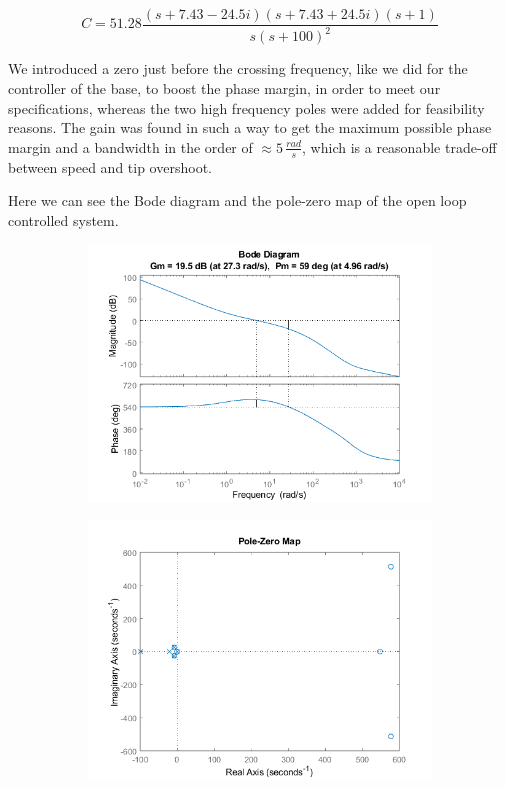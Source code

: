 \begin{equation*}
    C = 51.28 \frac{(s+7.43-24.5i)(s+7.43+24.5i)(s+1)}{s(s+100)^2}
\end{equation*}

We introduced a zero just before the crossing frequency, like we did for the controller of the base, to boost the phase margin, in order to meet our specifications, whereas the two high frequency poles were added for feasibility reasons. The gain was found in such a way to get the maximum possible phase margin and a bandwidth in the order of $\approx 5 \, \frac{rad}{s}$, which is a reasonable trade-off between speed and tip overshoot. 

Here we can see the Bode diagram and the pole-zero map of the open loop controlled system.

\begin{figure}[H]
     \centering
     \begin{subfigure}{0.47\textwidth}
         \centering
         \includegraphics[width=\textwidth]{./images/Chapter 4/FB/Bode_controlled.png}
     \end{subfigure}
     \hfill
     \begin{subfigure}{0.47\textwidth}
         \centering
         \includegraphics[width=\textwidth]{./images/Chapter 4/FB/pzmap_controlled.png}
     \end{subfigure}
\end{figure}

